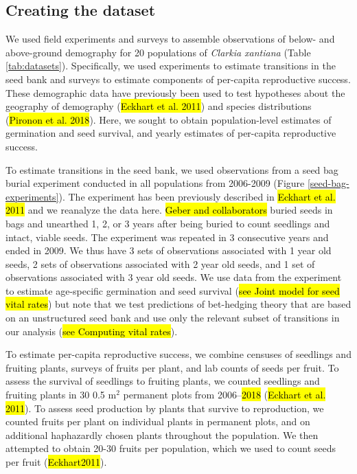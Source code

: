 \documentclass[12pt, oneside, titlepage]{article}   	%
\begin{document}
\subsection{Creating the dataset}

We used field experiments and surveys to assemble observations of below- and above-ground demography for 20 populations of \textit{Clarkia xantiana} (Table \ref{tab:datasets}). Specifically, we used experiments to estimate transitions in the seed bank and surveys to estimate components of per-capita reproductive success. These demographic data have previously been used to test hypotheses about the geography of demography (\hl{Eckhart et al. 2011}) and species distributions (\hl{Pironon et al. 2018}). Here, we sought to obtain population-level estimates of germination and seed survival, and yearly estimates of per-capita reproductive success.

To estimate transitions in the seed bank, we used observations from a seed bag burial experiment conducted in all populations from 2006-2009 (Figure \ref{seed-bag-experiments}). The experiment has been previously described in \hl{Eckhart et al. 2011} and we reanalyze the data here. \hl{Geber and collaborators} buried seeds in bags and unearthed 1, 2, or 3 years after being buried to count seedlings and intact, viable seeds. The experiment was repeated in 3 consecutive years and ended in 2009. We thus have 3 sets of observations associated with 1 year old seeds, 2 sets of observations associated with 2 year old seeds, and 1 set of observations associated with 3 year old seeds. We use data from the experiment to estimate age-specific germination and seed survival (\hl{see Joint model for seed vital rates}) but note that we test predictions of bet-hedging theory that are based on an unstructured seed bank and use only the relevant subset of transitions in our analysis (\hl{see Computing vital rates}).

To estimate per-capita reproductive success, we combine censuses of seedlings and fruiting plants, surveys of fruits per plant, and lab counts of seeds per fruit. To assess the survival of seedlings to fruiting plants, we counted seedlings and fruiting plants in 30 0.5 m$^2$ permanent plots from 2006--\hl{2018} (\hl{Eckhart et al. 2011}). To assess seed production by plants that survive to reproduction, we counted fruits per plant on individual plants in permanent plots, and on additional haphazardly chosen plants throughout the population. We then attempted to obtain 20-30 fruits per population, which we used to count seeds per fruit (\hl{Eckhart2011}). 
\end{document}
